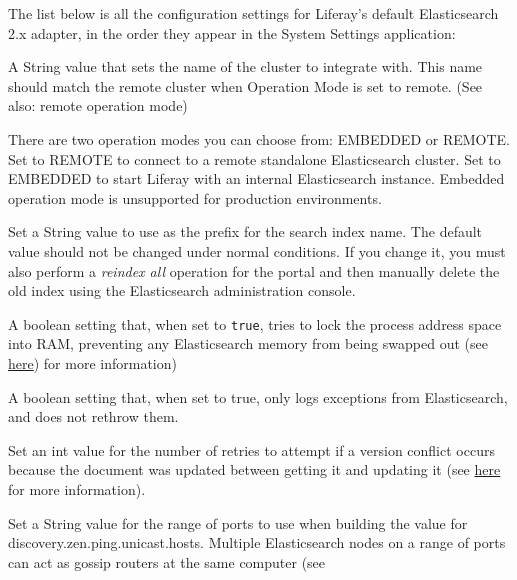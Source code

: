 \noindent\hrulefill

The list below is all the configuration settings for Liferay's default
Elasticsearch 2.x adapter, in the order they appear in the System
Settings application:

\begin{description}
\tightlist
\item[\texttt{clusterName=LiferayElasticsearchCluster}]
A String value that sets the name of the cluster to integrate with. This
name should match the remote cluster when Operation Mode is set to
remote. (See also: remote operation mode)
\item[\texttt{operationMode=EMBEDDED}]
There are two operation modes you can choose from: EMBEDDED or REMOTE.
Set to REMOTE to connect to a remote standalone Elasticsearch cluster.
Set to EMBEDDED to start Liferay with an internal Elasticsearch
instance. Embedded operation mode is unsupported for production
environments.
\item[\texttt{indexNamePrefix=liferay-}]
Set a String value to use as the prefix for the search index name. The
default value should not be changed under normal conditions. If you
change it, you must also perform a \emph{reindex all} operation for the
portal and then manually delete the old index using the Elasticsearch
administration console.
\item[\texttt{bootstrapMlockAll=false}]
A boolean setting that, when set to \texttt{true}, tries to lock the
process address space into RAM, preventing any Elasticsearch memory from
being swapped out (see
\href{https://www.elastic.co/guide/en/elasticsearch/reference/2.2/setup-configuration.html\#setup-configuration-memory}{here})
for more information)
\item[\texttt{logExceptionsOnly=true}]
A boolean setting that, when set to true, only logs exceptions from
Elasticsearch, and does not rethrow them.
\item[\texttt{retryOnConflict=5}]
Set an int value for the number of retries to attempt if a version
conflict occurs because the document was updated between getting it and
updating it (see
\href{https://www.elastic.co/guide/en/elasticsearch/reference/2.2/docs-update.html\#_parameters_3}{here}
for more information).
\item[\texttt{discoveryZenPingUnicastHostsPort=9300-9400}]
Set a String value for the range of ports to use when building the value
for discovery.zen.ping.unicast.hosts. Multiple Elasticsearch nodes on a
range of ports can act as gossip routers at the same computer (see

\end{description}
